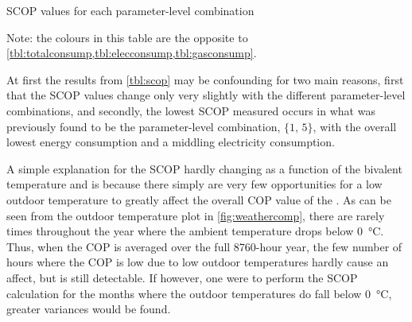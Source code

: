 \begin{table}[htb]
    \begin{threeparttable}
    \footnotesize
    \centering
    \caption{\acs{SCOP} values for each parameter-level combination}
    \label{tbl:scop}
    \begin{tablenotes}
        \small
        \item Note: the colours in this table are the opposite to \cref{tbl:totalconsump,tbl:elecconsump,tbl:gasconsump}. 
      \end{tablenotes}
    \end{threeparttable}
\end{table}

At first the results from \cref{tbl:scop} may be confounding for two main reasons, first that the \ac{SCOP} values change only very slightly with the different parameter-level combinations, and secondly, the lowest \ac{SCOP} measured occurs in what was previously found to be the parameter-level combination, $\{1\text{, }5\}$, with the overall lowest energy consumption and a middling electricity consumption.

A simple explanation for the \ac{SCOP} hardly changing as a function of the bivalent temperature and is because there simply are very few opportunities for a low outdoor temperature to greatly affect the overall \ac{COP} value of the \HP. As can be seen from the outdoor temperature plot in \cref{fig:weathercomp}, there are rarely times throughout the year where the ambient temperature drops below \qty{0}{\celsius}. Thus, when the \ac{COP} is averaged over the full 8760-hour year, the few number of hours where the \ac{COP} is low due to low outdoor temperatures hardly cause an affect, but is still detectable. If however, one were to perform the \ac{SCOP} calculation for the months where the outdoor temperatures do fall below \qty{0}{\celsius}, greater variances would be found. 

